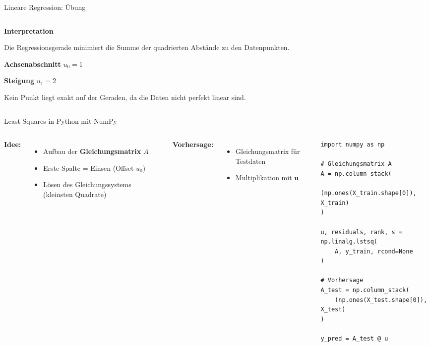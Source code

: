 {\begin{frame}{Lineare Regression: Übung}
{\begin{columns}[T,onlytextwidth]
\begin{column}{0.35\textwidth}
\footnotesize
\textbf{Interpretation}

Die Regressionsgerade minimiert die Summe der quadrierten Abstände zu den Datenpunkten.

\vspace{0.6em}
\textbf{Achsenabschnitt} $u_0 = 1$

\textbf{Steigung} $u_1 = 2$

\vspace{0.6em}
Kein Punkt liegt exakt auf der Geraden, da die Daten nicht perfekt linear sind.
\end{column}

\end{columns}
}

\end{frame}
}

\begin{frame}[fragile]{Least Squares in Python mit NumPy}

\begin{columns}


\textbf{Idee:}
\begin{itemize}
\item Aufbau der \textbf{Gleichungsmatrix} $A$
\item Erste Spalte = Einsen (Offset $u_0$)
\item Lösen des Gleichungssystems (kleinsten Quadrate)
\end{itemize}

\medskip

\textbf{Vorhersage:}
\begin{itemize}
\item  Gleichungsmatrix für Testdaten
\item Multiplikation mit $\mathbf{u}$
\end{itemize}


\begin{verbatim}
import numpy as np

# Gleichungsmatrix A
A = np.column_stack(
    (np.ones(X_train.shape[0]), X_train)
)

u, residuals, rank, s = np.linalg.lstsq(
    A, y_train, rcond=None
)

# Vorhersage
A_test = np.column_stack(
    (np.ones(X_test.shape[0]), X_test)
)

y_pred = A_test @ u
\end{verbatim}

\end{columns}


\end{frame}


